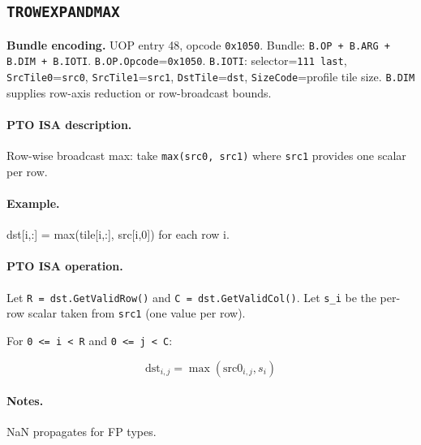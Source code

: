 \subsection{\texttt{TROWEXPANDMAX}}
\noindent\textbf{Bundle encoding.} UOP entry 48, opcode \texttt{0x1050}. Bundle: \texttt{B.OP + B.ARG + B.DIM + B.IOTI}. \texttt{B.OP.Opcode}=\texttt{0x1050}. \texttt{B.IOTI}: selector=\texttt{111 last}, \texttt{SrcTile0}=\texttt{src0}, \texttt{SrcTile1}=\texttt{src1}, \texttt{DstTile}=\texttt{dst}, \texttt{SizeCode}=profile tile size. \texttt{B.DIM} supplies row-axis reduction or row-broadcast bounds.\par\smallskip
{\small
\paragraph{PTO ISA description.}
Row-wise broadcast max: take \texttt{max(src0, src1)} where \texttt{src1} provides one scalar per row.
\paragraph{Example.}
dst[i,:] = max(tile[i,:], src[i,0]) for each row i.
\par\smallskip
\paragraph{PTO ISA operation.}
Let \texttt{R = dst.GetValidRow()} and \texttt{C = dst.GetValidCol()}. Let \texttt{s\_i} be the per-row scalar taken from \texttt{src1} (one value per row).

For \texttt{0 \textless{}= i \textless{} R} and \texttt{0 \textless{}= j \textless{} C}:

\[
\mathrm{dst}_{i,j} = \max(\mathrm{src0}_{i,j}, s_i)
\]
}\par\smallskip
\paragraph{Notes.}
NaN propagates for FP types.
